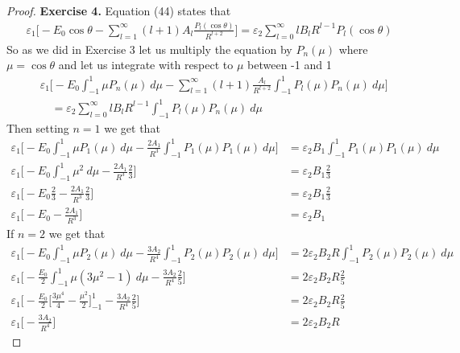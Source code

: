 \documentclass[11pt]{article}
\theoremstyle{definition}
\begin{document}
\cleardoublepage
\begin{proof}{\textbf{Exercise 4.}}
Equation (44) states that
\begin{align*}
    \varepsilon_1\bigg[-E_0\cos\theta
    - \sum_{l=1}^\infty (l+1)A_l \frac{P_l(\cos\theta)}{R^{l+2}}\bigg]
    = \varepsilon_2\sum_{l=0}^\infty lB_lR^{l-1}P_l(\cos\theta)
\end{align*}
So as we did in Exercise 3 let us multiply the equation by $P_n(\mu)$ where
$\mu =\cos\theta$ and let us integrate with respect to $\mu$ between -1 and 1
\begin{align*}
    &\varepsilon_1\bigg[
    -E_0\int_{-1}^1 \mu P_n(\mu)~d\mu
    - \sum_{l=1}^\infty (l+1)\frac{A_l}{R^{l+2}} \int_{-1}^1P_l(\mu)P_n(\mu)~d\mu
    \bigg]\\
    &\quad= \varepsilon_2\sum_{l=0}^\infty lB_lR^{l-1}\int_{-1}^1 P_l(\mu)P_n(\mu)~d\mu
\end{align*}
Then setting $n = 1$ we get that
\begin{align*}
    \varepsilon_1\bigg[
    -E_0\int_{-1}^1 \mu P_1(\mu)~d\mu
    - \frac{2A_1}{R^{3}} \int_{-1}^1P_1(\mu)P_1(\mu)~d\mu
    \bigg]
    &= \varepsilon_2 B_1 \int_{-1}^1 P_1(\mu)P_1(\mu)~d\mu\\
    \varepsilon_1\bigg[
    -E_0\int_{-1}^1 \mu^2~d\mu - \frac{2A_1}{R^{3}}\frac{2}{3}
    \bigg] &= \varepsilon_2 B_1 \frac{2}{3}\\
    \varepsilon_1\bigg[-E_0\frac{2}{3} - \frac{2A_1}{R^{3}}\frac{2}{3}\bigg]
    &= \varepsilon_2 B_1 \frac{2}{3}\\
    \varepsilon_1\bigg[-E_0 - \frac{2A_1}{R^{3}}\bigg] &= \varepsilon_2 B_1
\end{align*}
If $n = 2$ we get that
\begin{align*}
    \varepsilon_1\bigg[
    -E_0\int_{-1}^1 \mu P_2(\mu)~d\mu
    - \frac{3A_2}{R^{4}} \int_{-1}^1P_2(\mu)P_2(\mu)~d\mu
    \bigg]
    &= 2\varepsilon_2 B_2 R\int_{-1}^1 P_2(\mu)P_2(\mu)~d\mu\\
    \varepsilon_1\bigg[
    -\frac{E_0}{2}\int_{-1}^1 \mu(3\mu^2 - 1)~d\mu
    - \frac{3A_2}{R^{4}}\frac{2}{5}
    \bigg]
    &= 2\varepsilon_2 B_2 R\frac{2}{5}\\
    \varepsilon_1\bigg[
    -\frac{E_0}{2}\bigg[\frac{3\mu^4}{4} - \frac{\mu^2}{2}\bigg]_{-1}^1
    - \frac{3A_2}{R^{4}}\frac{2}{5}\bigg]
    &= 2\varepsilon_2 B_2 R\frac{2}{5}\\
    \varepsilon_1\bigg[-\frac{3A_2}{R^{4}}\bigg]
    &= 2\varepsilon_2 B_2 R
\end{align*}

\end{proof}
\end{document}
